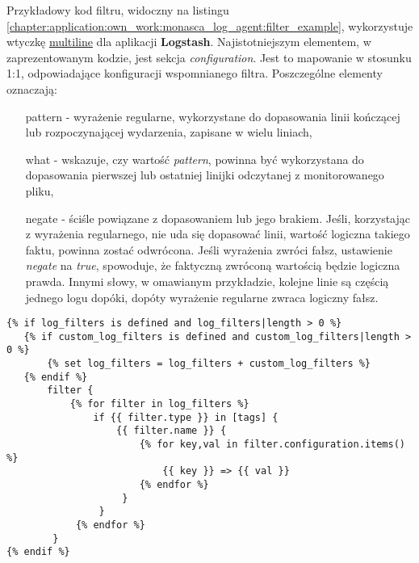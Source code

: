 Przykładowy kod filtru, widoczny na listingu \ref{chapter:application:own_work:monasca_log_agent:filter_example}, wykorzystuje wtyczkę
\href{https://www.elastic.co/guide/en/logstash/current/plugins-filters-multiline.html}{multiline} dla aplikacji \textbf{Logstash}.
Najistotniejszym elementem, w zaprezentowanym kodzie, jest sekcja \textit{configuration}. Jest to mapowanie w stosunku 1:1, odpowiadające
konfiguracji wspomnianego filtra. Poszczególne elementy oznaczają:
\begin{itemize}
    \item[pattern] - wyrażenie regularne, wykorzystane do dopasowania linii kończącej lub rozpoczynającej wydarzenia, zapisane w wielu liniach,
    \item[what] - wskazuje, czy wartość \textit{pattern}, powinna być wykorzystana do dopasowania pierwszej lub ostatniej linijki odczytanej
    z monitorowanego pliku,
    \item[negate] - ściśle powiązane z dopasowaniem lub jego brakiem. Jeśli, korzystając z wyrażenia regularnego, nie uda się dopasować linii,
    wartość logiczna takiego faktu, powinna zostać odwrócona. Jeśli wyrażenia zwróci fałsz, ustawienie \textit{negate} na \textit{true}, 
    spowoduje, że faktyczną zwróconą wartością będzie logiczna prawda. Innymi słowy, w omawianym przykładzie, kolejne linie są częścią jednego
    logu dopóki, dopóty wyrażenie regularne zwraca logiczny fałsz. 
\end{itemize}

\begin{listing}[H]
    \begin{verbatim}
{% if log_filters is defined and log_filters|length > 0 %}
   {% if custom_log_filters is defined and custom_log_filters|length > 0 %}
       {% set log_filters = log_filters + custom_log_filters %}
   {% endif %}
       filter {
           {% for filter in log_filters %}
               if {{ filter.type }} in [tags] {
                   {{ filter.name }} {
                       {% for key,val in filter.configuration.items() %}
                           {{ key }} => {{ val }}
                       {% endfor %}
                    }
                }
            {% endfor %}
        }
{% endif %}
    \end{verbatim}
    \label{chapter:application:own_work:monasca_log_agent:filter_applying}
    \caption[Wpisanie filtrów do pliku konfiguracyjnego \textbf{Logstash}]{
        Wpisanie filtrów do pliku konfiguracyjnego \textbf{Logstash}, źródło: \url{https://github.com/FujitsuEnablingSoftwareTechnologyGmbH/ansible-monasca-log-agent/blob/master/templates/agent.conf.j2}}
\end{listing}

